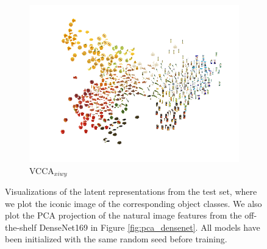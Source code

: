 \begin{figure}[t]
\begin{subfigure}[b]{0.3\textwidth}
         \centering
         \includegraphics[width=\textwidth]{PaperB/figures_and_tables/latent_space_visualizations/pca_latents_vcca_xiwy_seed2.png}
         \caption{VCCA$_{x i w y}$}
         \label{fig:pca_vcca_xiwy}
     \end{subfigure} 
    \caption{Visualizations of the latent representations from the test set, where we plot the iconic image of the corresponding object classes. We also plot the PCA projection of the natural image features from the off-the-shelf DenseNet169 in Figure \ref{fig:pca_densenet}. All models have been initialized with the same random seed before training. %
    }
    \label{fig:2d_visualizations_pca}
\end{figure}
